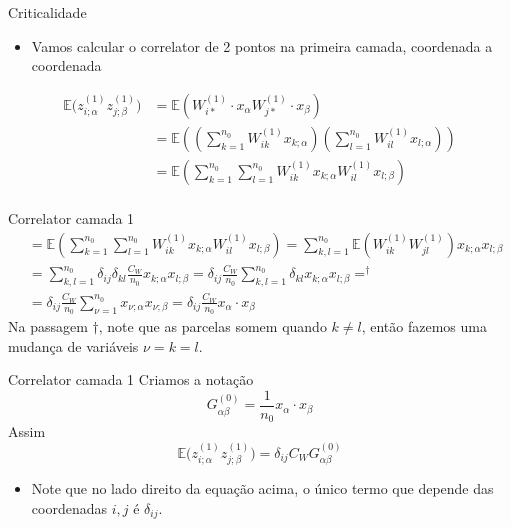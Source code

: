 \documentclass{beamer}
\newcommand{\EE}{\mathbb{E}}
\newcommand{\aaA}{\alpha}
\newcommand{\aaB}{\beta}
\begin{document}
\begin{frame}{Criticalidade}
	\begin{itemize}
		\item Vamos calcular o correlator de 2 pontos na primeira camada, coordenada a coordenada
	\end{itemize}
		\begin{align*}
			\EE\big(z^{(1)}_{i;\aaA} z^{(1)}_{j;\aaB}\big) &= \EE\left(W^{(1)}_{i*}\cdot x_{\aaA}W^{(1)}_{j*}\cdot x_{\aaB} \right)\\
		&= \EE\left( \left(\sum_{k=1}^{n_0} W^{(1)}_{ik}x_{k;\aaA}\right)
		\left(\sum_{l=1}^{n_0} W^{(1)}_{il}x_{l;\aaA}\right) \right)\\
		&= \EE\left(\sum_{k=1}^{n_0}\sum_{l=1}^{n_0}W^{(1)}_{ik}x_{k;\aaA}W^{(1)}_{il}x_{l;\aaB} \right) \\
		\end{align*}
\end{frame}
\begin{frame}{Correlator camada 1}
	\begin{align*}
		&=\EE\left(\sum_{k=1}^{n_0}\sum_{l=1}^{n_0}W^{(1)}_{ik}x_{k;\aaA}W^{(1)}_{il}x_{l;\aaB} \right) = \sum_{k,l=1}^{n_0} \EE\left(W^{(1)}_{ik}W^{(1)}_{jl}\right) x_{k;\aaA}x_{l;\aaB} \\
		&= \sum_{k,l=1}^{n_0} \delta_{ij}\delta_{kl}\frac{C_W}{n_0} x_{k;\aaA}x_{l;\aaB} =\delta_{ij}\frac{C_W}{n_0} \sum_{k,l=1}^{n_0}\delta_{kl}x_{k;\aaA}x_{l;\aaB} =  ^{\dagger}\\
		&= \delta_{ij}\frac{C_W}{n_0} \sum_{\nu=1}^{n_0} x_{\nu;\aaA}x_{\nu;\aaB} =  \delta_{ij}\frac{C_W}{n_0}  x_{\aaA} \cdot x_{\aaB} \tag{3.8} \label{eq:corrcamada1}
	\end{align*}
	Na passagem $\dagger$, note que as parcelas somem quando $k\neq l$, então fazemos uma mudança de variáveis $\nu = k = l$.
\end{frame}

\begin{frame}{Correlator camada 1}
	Criamos a notação 
	\begin{equation*}\tag{3.9}\label{eq:G0}
		G_{\aaA\aaB}^{(0)} = \frac{1}{n_0} x_{\aaA}\cdot x_{\aaB}
	\end{equation*}
	Assim 
	\begin{equation*}\tag{3.10}\label{eq:correlator1G}
		\EE\big(z^{(1)}_{i;\aaA} z^{(1)}_{j;\aaB}\big) = \delta_{ij}C_WG_{\aaA\aaB}^{(0)}
	\end{equation*}
	\begin{itemize}
		\item Note que no lado direito da equação acima, o único termo que depende das coordenadas $i,j$ é $\delta_{ij}$.
\end{itemize}
\end{frame}
\end{document}
